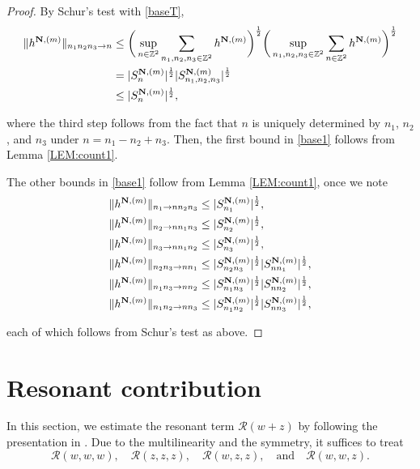 \documentclass[%
11pt,  reqno]{amsart}
\newcommand{\1}{\hspace{0.2mm}\text{I}\hspace{0.2mm}}
\newcommand{\noi}{\noindent}
\newcommand{\Z}{\mathbb{Z}}
\newcommand{\RR}{\mathcal{R}}
\numberwithin{equation}{section}
\numberwithin{theorem}{section}
\begin{document}
\begin{proof}
By Schur's test with \eqref{baseT}, 
\begin{align*}
\| h^{{\bf N}, (m)} \|_{n_1n_2n_3 \to n}
& \le \bigg( \sup_{n \in \Z^2} \sum_{n_1, n_2, n_3 \in \Z^2}
h^{{\bf N}, (m)} \bigg)^\frac 12 
\bigg(\sup_{n_1, n_2, n_3 \in \Z^2} \sum_{n \in \Z^2}
h^{{\bf N}, (m)}\bigg)^\frac 12 \\
& =   |S_n^{{\bf N}, (m)}|^\frac 12 |S^{{\bf N}, (m)}_{n_1, n_2, n_3}|^\frac 12 \\
& \le   |S_n^{{\bf N}, (m)}|^\frac 12, 
\end{align*}

\noi
where the third step follows
from the fact that $n$ is uniquely determined 
by $n_1$, $n_2$, and $n_3$ under $n = n_1 - n_2 + n_3$.
Then, the first bound in \eqref{base1}
follows from Lemma \ref{LEM:count1}.

The other bounds in \eqref{base1}
follow from 
Lemma \ref{LEM:count1}, 
once we note
\begin{align*}
\| h^{{\bf N},(m)}  \|_{n_1\to nn_2n_3} & \le |S^{{\bf N},(m)}_{n_1}|^{\frac12},  \\
\| h^{{\bf N},(m)}  \|_{n_2\to nn_1n_3 } & \le |S^{{\bf N},(m)}_{n_2}|^{\frac12},  \\
\| h^{{\bf N},(m)}  \|_{n_3\to nn_1n_2 } & \le |S^{{\bf N},(m)}_{n_3}|^{\frac12},  \\
\| h^{{\bf N},(m)}  \|_{n_2n_3\to nn_1} & \le 
|S^{{\bf N},(m)}_{n_2n_3}|^{\frac12} 
|S^{{\bf N},(m)}_{nn_1}|^{\frac12} , 
\\
\| h^{{\bf N},(m)}  \|_{n_1n_3 \to nn_2} & \le |S^{{\bf N},(m)}_{n_1n_3}|^{\frac12}
 |S^{{\bf N},(m)}_{nn_2}|^{\frac12},   \\
\| h^{{\bf N},(m)}  \|_{n_1n_2 \to n n_3} & \le |S^{{\bf N},(m)}_{n_1n_2}|^{\frac12} 
|S^{{\bf N},(m)}_{nn_3}|^{\frac12}, 
\end{align*}

\noi
each of 
which follows from Schur's test as above.
\end{proof}






\section{Resonant contribution}\label{SEC:res}

In this section, we estimate the
resonant term $\RR(w+z)$
by  following 
the presentation in 
 \cite[Subsection 4.2]{CO}.
Due to the multilinearity and the symmetry, it suffices to treat
\[\RR(w, w, w), \quad 
\RR(z, z, z), \quad
\RR(w, z, z), \quad \text{and}\quad 
\RR(w, w, z).\]
\end{document}
